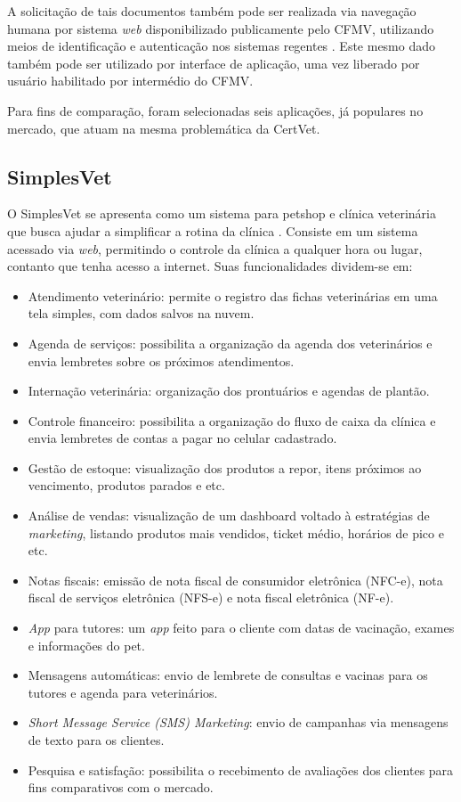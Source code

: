\documentclass[
    12pt,               %
    openright,          %
    oneside,
    a4paper,            %
    BIBLATEX,           %
    TODO,               %
    english,            %
    brazil              %
    ]{ifsp-spo-inf-ctds}
\begin{document}
        A solicitação de tais documentos também pode ser realizada via navegação humana por sistema \emph{web} disponibilizado publicamente pelo CFMV, utilizando meios de identificação e autenticação nos sistemas regentes . Este mesmo dado também pode ser utilizado por interface de aplicação, uma vez liberado por usuário habilitado por intermédio do CFMV.
    
        Para fins de comparação, foram selecionadas seis aplicações, já populares no mercado, que atuam na mesma problemática da CertVet.

    \subsection{SimplesVet}
    O SimplesVet se apresenta como um sistema para petshop e clínica veterinária que busca ajudar a simplificar a rotina da clínica . Consiste em um sistema acessado via \emph{web}, permitindo o controle da clínica a qualquer hora ou lugar, contanto que tenha acesso a internet. Suas funcionalidades dividem-se em:

\begin{itemize}
    
    \item Atendimento veterinário: permite o registro das fichas veterinárias em uma tela simples, com dados salvos na nuvem.
    \item Agenda de serviços: possibilita a organização da agenda dos veterinários e envia lembretes sobre os próximos atendimentos.
    \item Internação veterinária: organização dos prontuários e agendas de plantão.
    \item Controle financeiro: possibilita a organização do fluxo de caixa da clínica e envia lembretes de contas a pagar no celular cadastrado.
    \item Gestão de estoque: visualização dos produtos a repor, itens próximos ao vencimento, produtos parados e etc.
    \item Análise de vendas: visualização de um dashboard voltado à estratégias de \emph{marketing}, listando produtos mais vendidos, ticket médio, horários de pico e etc.
    \item Notas fiscais: emissão de nota fiscal de consumidor eletrônica (NFC-e), nota fiscal de serviços eletrônica (NFS-e) e nota fiscal eletrônica (NF-e).
    \item \emph{App} para tutores: um \emph{app} feito para o cliente com datas de vacinação, exames e informações do pet.
    \item Mensagens automáticas: envio de lembrete de consultas e vacinas para os tutores e agenda para veterinários.
    \item \emph{Short Message Service (SMS) Marketing}: envio de campanhas via mensagens de texto para os clientes.
    \item Pesquisa e satisfação: possibilita o recebimento de avaliações dos clientes para fins comparativos com o mercado.
\end{itemize}
\end{document}
